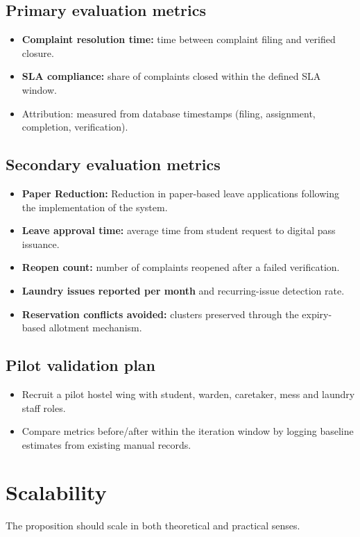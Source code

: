 \documentclass[11pt,a4paper]{article}
\begin{document}
\subsection{Primary evaluation metrics}
\begin{itemize}[leftmargin=0.7cm]
    \item \textbf{Complaint resolution time:} time between complaint filing and verified
    closure.
    \item \textbf{SLA compliance:} share of complaints closed within the defined SLA window.
    \item Attribution: measured from database timestamps (filing, assignment, completion,
    verification).
\end{itemize}

\subsection{Secondary evaluation metrics}
\begin{itemize}[leftmargin=0.7cm]
    \item \textbf{Paper Reduction:} Reduction in paper-based leave applications following the implementation of the system.
    \item \textbf{Leave approval time:} average time from student request to digital pass
    issuance.
    \item \textbf{Reopen count:} number of complaints reopened after a failed verification.
    \item \textbf{Laundry issues reported per month} and recurring-issue detection rate.
    \item \textbf{Reservation conflicts avoided:} clusters preserved through the expiry-based
    allotment mechanism.
\end{itemize}

\subsection{Pilot validation plan }
\begin{itemize}[leftmargin=0.7cm]
    \item Recruit a pilot hostel wing with student, warden, caretaker, mess and laundry staff
    roles.
    \item Compare metrics before/after within the iteration window by logging baseline
    estimates from existing manual records.
\end{itemize}

\section{Scalability }
The proposition should scale in both theoretical and practical senses.
\end{document}
